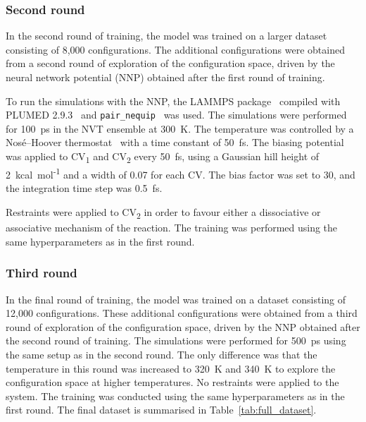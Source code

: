 \subsubsection{Second round}
In the second round of training, the model was trained on a larger dataset consisting of 8,000 configurations. The additional configurations were obtained from a second round of exploration of the configuration space, driven by the neural network potential (NNP) obtained after the first round of training.

To run the simulations with the NNP, the LAMMPS package~\citep{thompsonLAMMPSFlexibleSimulation2022} compiled with PLUMED 2.9.3~\citep{tribelloPLUMED2New2014} and \texttt{pair\_nequip}~\citep{MirgroupPair_nequip} was used. The simulations were performed for 100~ps in the NVT ensemble at 300~K. The temperature was controlled by a Nos\'e--Hoover thermostat~\citep{noseUnifiedFormulationConstant1984, hooverCanonicalDynamicsEquilibrium1985} with a time constant of 50~fs. The biasing potential was applied to CV\textsubscript{1} and CV\textsubscript{2} every 50~fs, using a Gaussian hill height of 2~kcal~mol\textsuperscript{-1} and a width of 0.07 for each CV. The bias factor was set to 30, and the integration time step was 0.5~fs.

Restraints were applied to CV\textsubscript{2} in order to favour either a dissociative or associative mechanism of the reaction. The training was performed using the same hyperparameters as in the first round.



\subsubsection{Third round}
In the final round of training, the model was trained on a dataset consisting of 12,000 configurations. These additional configurations were obtained from a third round of exploration of the configuration space, driven by the NNP obtained after the second round of training. The simulations were performed for 500~ps using the same setup as in the second round. The only difference was that the temperature in this round was increased to 320~K and 340~K to explore the configuration space at higher temperatures. No restraints were applied to the system. The training was conducted using the same hyperparameters as in the first round. The final dataset is summarised in Table~\ref{tab:full_dataset}.




